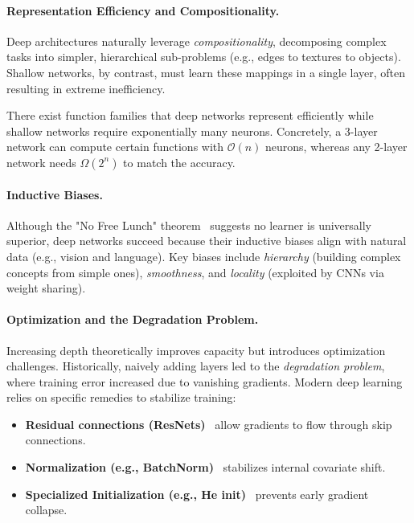 \paragraph{Representation Efficiency and Compositionality.}
Deep architectures naturally leverage \emph{compositionality}, decomposing complex tasks into simpler, hierarchical sub-problems (e.g., edges to textures to objects). Shallow networks, by contrast, must learn these mappings in a single layer, often resulting in extreme inefficiency.

\begin{theorem}
    There exist function families that deep networks represent efficiently while shallow networks require exponentially many neurons. Concretely, a 3-layer network can compute certain functions with $\mathcal{O}(n)$ neurons, whereas any 2-layer network needs $\Omega(2^n)$ to match the accuracy.
\end{theorem}

\paragraph{Inductive Biases.}
Although the "No Free Lunch" theorem~\cite{Wolpert1997} suggests no learner is universally superior, deep networks succeed because their inductive biases align with natural data (e.g., vision and language). Key biases include \emph{hierarchy} (building complex concepts from simple ones), \emph{smoothness}, and \emph{locality} (exploited by CNNs via weight sharing).

\paragraph{Optimization and the Degradation Problem.}
Increasing depth theoretically improves capacity but introduces optimization challenges. Historically, naively adding layers led to the \emph{degradation problem}, where training error increased due to vanishing gradients. Modern deep learning relies on specific remedies to stabilize training:
\begin{itemize}[noitemsep]
    \item \textbf{Residual connections (ResNets)}~\cite{He2016} allow gradients to flow through skip connections.
    \item \textbf{Normalization (e.g., BatchNorm)}~\cite{Ioffe2015} stabilizes internal covariate shift.
    \item \textbf{Specialized Initialization (e.g., He init)}~\cite{He2015} prevents early gradient collapse.
\end{itemize}

